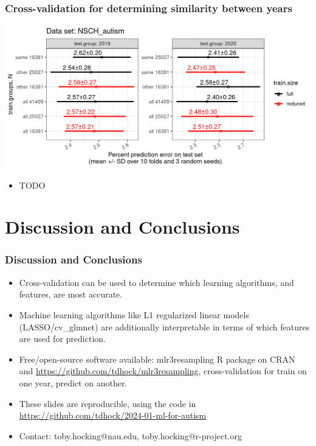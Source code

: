 \documentclass{beamer}
\begin{document}
\begin{frame}
  \frametitle{Cross-validation for determining similarity between years}
  \includegraphics[width=\textwidth]{figures-same-other/NSCH_autism_error_mean_sd_more.png}
  \begin{itemize}
  \item TODO
  \end{itemize}
\end{frame}

\section{Discussion and Conclusions}

\begin{frame}
  \frametitle{Discussion and Conclusions}
  \begin{itemize}
  \item Cross-validation can be used to determine which learning
    algorithms, and features, are most accurate.
  \item Machine learning algorithms like L1 regularized linear models
    (LASSO/cv\_glmnet) are additionally interpretable in terms of
    which features are used for prediction.
  \item Free/open-source software available: mlr3resampling R package
    on CRAN and \url{https://github.com/tdhock/mlr3resampling},
    cross-validation for train on one year, predict on another.
\item These slides are reproducible, using the code in \url{https://github.com/tdhock/2024-01-ml-for-autism}
  \item Contact: toby.hocking@nau.edu,
    toby.hocking@r-project.org
  \end{itemize}
\end{frame}
\end{document}

